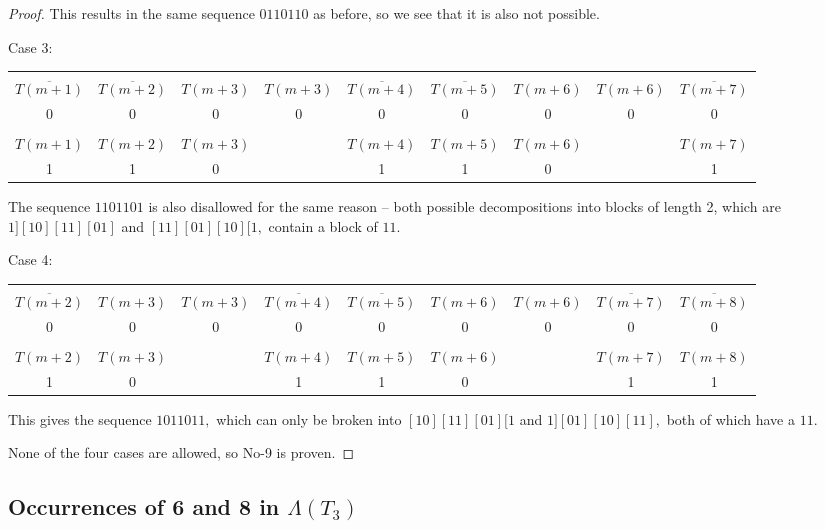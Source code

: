 \documentclass{article}
\begin{document}
\begin{proof}
This results in the same sequence $0110110$ as before, so we see that it is also not possible.

Case 3:

\begin{center}
\begin{tabular}{ |c|c|c|c|c|c|c|c|c| } 
 \hline
&&&&&&&&\\
$\overline{T(m+1)}$ & $\overline{T(m+2)}$ & $T(m+3)$ & $T(m+3)$ & $\overline{T(m+4)}$ & $\overline{T(m+5)}$ & $T(m+6)$ & $T(m+6)$ & $\overline{T(m+7)}$ \\ 
0 & 0 & 0 & 0 & 0 & 0 & 0 & 0 & 0 \\
\hline
&&&&&&&&\\
$T(m+1)$ & $T(m+2)$ & $T(m+3)$ & & $T(m+4)$ & $T(m+5)$ & $T(m+6)$ & & $T(m+7)$ \\
1 & 1 & 0 & & 1 & 1 & 0 & & 1 \\
 \hline
\end{tabular}
\end{center}

The sequence $1101101$ is also disallowed for the same reason -- both possible decompositions into blocks of length 2, which are $1][10][11][01]$ and $[11][01][10][1,$ contain a block of $11.$

Case 4:

\begin{center}
\begin{tabular}{ |c|c|c|c|c|c|c|c|c| } 
 \hline
&&&&&&&&\\
 $\overline{T(m+2)}$ & $T(m+3)$ & $T(m+3)$ & $\overline{T(m+4)}$ & $\overline{T(m+5)}$ & $T(m+6)$ & $T(m+6)$ & $\overline{T(m+7)}$ & $\overline{T(m+8)}$ \\ 
0 & 0 & 0 & 0 & 0 & 0 & 0 & 0 & 0 \\
\hline
&&&&&&&&\\
$T(m+2)$ & $T(m+3)$ & & $T(m+4)$ & $T(m+5)$ & $T(m+6)$ & & $T(m+7)$ & $T(m+8)$ \\
1 & 0 & & 1 & 1 & 0 & & 1 & 1 \\
 \hline
\end{tabular}
\end{center}

This gives the sequence $1011011,$ which can only be broken into $[10][11][01][1$ and $1][01][10][11],$ both of which have a $11.$

None of the four cases are allowed, so No-9 is proven.
\end{proof}

\subsection{Occurrences of 6 and 8 in $\Lambda(T_3)$}
\end{document}
